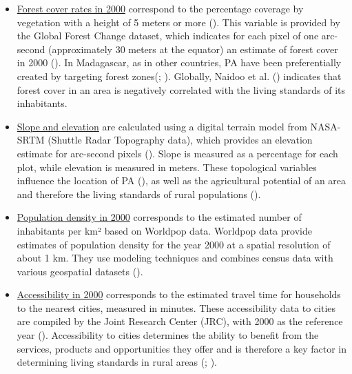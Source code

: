 \documentclass[
]{article}
\begin{document}
\begin{itemize}
\item
  \ul{Forest cover rates in 2000} correspond to the percentage coverage
  by vegetation with a height of 5 meters or more
  (). This variable is
  provided by the Global Forest Change dataset, which indicates for each
  pixel of one arc-second (approximately 30 meters at the equator) an
  estimate of forest cover in 2000 (). In Madagascar, as in other countries, PA have been
  preferentially created by targeting forest
  zones(;
  ). Globally, Naidoo et
  al. () indicates that
  forest cover in an area is negatively correlated with the living
  standards of its inhabitants.
\item
  \ul{Slope and elevation} are calculated using a digital terrain model
  from NASA-SRTM (Shuttle Radar Topography data), which provides an
  elevation estimate for arc-second pixels
  (). Slope is
  measured as a percentage for each plot, while elevation is measured in
  meters. These topological variables influence the location of PA
  (), as well as the
  agricultural potential of an area and therefore the living standards
  of rural populations
  ().
\item
  \ul{Population density in 2000} corresponds to the estimated number of
  inhabitants per km² based on Worldpop data. Worldpop data provide
  estimates of population density for the year 2000 at a spatial
  resolution of about 1 km. They use modeling techniques and combines
  census data with various geospatial datasets
  ().
\item
  \ul{Accessibility in 2000} corresponds to the estimated travel time
  for households to the nearest cities, measured in minutes. These
  accessibility data to cities are compiled by the Joint Research Center
  (JRC), with 2000 as the reference year
  ().
  Accessibility to cities determines the ability to benefit from the
  services, products and opportunities they offer and is therefore a key
  factor in determining living standards in rural areas
  (;
  ).
\end{itemize}
\end{document}
